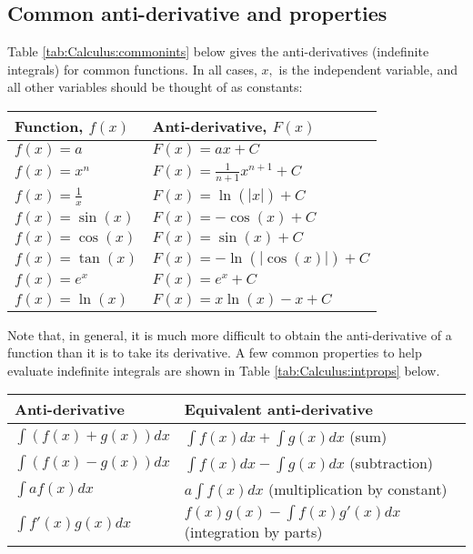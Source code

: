 \subsection{Common anti-derivative and properties}
Table \ref{tab:Calculus:commonints} below gives the anti-derivatives (indefinite integrals) for common functions. In all cases, $x,$ is the independent variable, and all other variables should be thought of as constants:
\begin{center}
\begin{tabular}{l l}
\textbf{Function, $f(x)$} & \textbf{Anti-derivative, $F(x)$}\\
\hline\hline
$f(x)=a$ & $F(x)=ax+C$ \\
$f(x)=x^n$ & $F(x)=\frac{1}{n+1}x^{n+1}+C$ \\
$f(x)=\frac{1}{x}$ & $F(x)=\ln(|x|)+C$ \\
$f(x)=\sin(x)$ & $F(x)=-\cos(x)+C$ \\
$f(x)=\cos(x)$ & $F(x)=\sin(x)+C$ \\
$f(x)=\tan(x)$ & $F(x)=-\ln(|\cos(x)|)+C$ \\
$f(x)=e^x$ & $F(x)=e^x+C$ \\
$f(x)=\ln(x)$ & $F(x)=x\ln(x)-x+C$ \\
\hline
\end{tabular}
\end{center}

Note that, in general, it is much more difficult to obtain the anti-derivative of a function than it is to take its derivative. A few common properties to help evaluate indefinite integrals are shown in Table \ref{tab:Calculus:intprops} below.
\begin{center}
\begin{tabular}{l l}
\textbf{Anti-derivative} & \textbf{Equivalent anti-derivative}\\
\hline\hline
$\int (f(x)+g(x)) dx$ &$\int f(x)dx+\int g(x) dx$ (sum)\\
$\int (f(x)-g(x)) dx$ &$\int f(x)dx-\int g(x) dx$ (subtraction)\\
$\int af(x) dx$ & $a\int f(x)dx$ (multiplication by constant)\\
$\int f'(x)g(x) dx$ & $f(x)g(x)-\int f(x)g'(x) dx$ (integration by parts)\\
\hline
\end{tabular}
\end{center}


